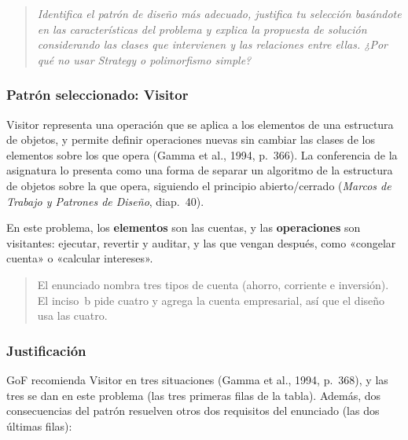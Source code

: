 
\begin{quote}
\itshape
Identifica el patrón de diseño más adecuado, justifica tu selección basándote en las
características del problema y explica la propuesta de solución considerando las clases
que intervienen y las relaciones entre ellas. ¿Por qué no usar Strategy o polimorfismo simple?
\end{quote}

\subsubsection{Patrón seleccionado: Visitor}

Visitor representa una operación que se aplica a los elementos de una estructura de objetos,
y permite definir operaciones nuevas sin cambiar las clases de los elementos sobre los que
opera (Gamma et al., 1994, p.~366). La conferencia de la asignatura lo presenta como una forma
de separar un algoritmo de la estructura de objetos sobre la que opera, siguiendo el principio
abierto/cerrado (\emph{Marcos de Trabajo y Patrones de Diseño}, diap.~40).

En este problema, los \textbf{elementos} son las cuentas, y las \textbf{operaciones} son
visitantes: ejecutar, revertir y auditar, y las que vengan después, como «congelar cuenta» o
«calcular intereses».

\begin{quote}
El enunciado nombra tres tipos de cuenta (ahorro, corriente e inversión). El inciso~b pide
cuatro y agrega la cuenta empresarial, así que el diseño usa las cuatro.
\end{quote}

\subsubsection{Justificación}

GoF recomienda Visitor en tres situaciones (Gamma et al., 1994, p.~368), y las tres se dan en
este problema (las tres primeras filas de la tabla). Además, dos consecuencias del patrón
resuelven otros dos requisitos del enunciado (las dos últimas filas):

